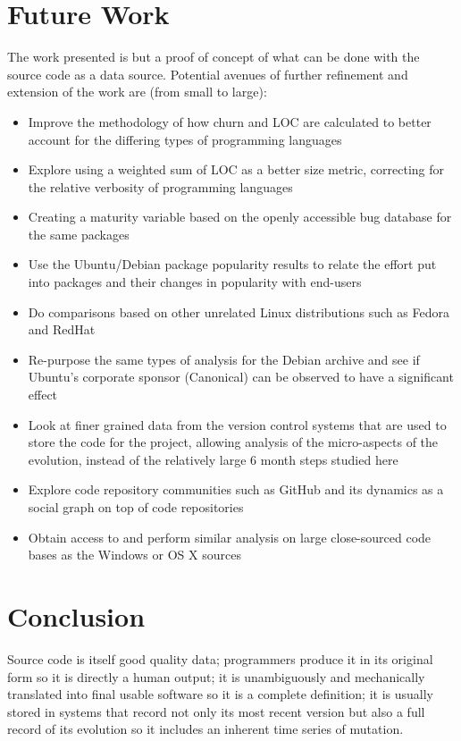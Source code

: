 \documentclass[11pt]{article}
\begin{document}
\section{Future Work}

The work presented is but a proof of concept of what can be done with the source code as a data source. Potential avenues of further refinement and extension of the work are (from small to large):
\begin{itemize}
\item Improve the methodology of how churn and LOC are calculated to better account for the differing types of programming languages
\item Explore using a weighted sum of LOC as a better size metric, correcting for the relative verbosity of programming languages
\item Creating a maturity variable based on the openly accessible bug database for the same packages
\item Use the Ubuntu/Debian package popularity results to relate the effort put into packages and their changes in popularity with end-users
\item Do comparisons based on other unrelated Linux distributions such as Fedora and RedHat
\item Re-purpose the same types of analysis for the Debian archive and see if Ubuntu's corporate sponsor (Canonical) can be observed to have a significant effect
\item Look at finer grained data from the version control systems that are used to store the code for the project, allowing analysis of the micro-aspects of the evolution, instead of the relatively large 6 month steps studied here
\item Explore code repository communities such as GitHub and its dynamics as a social graph on top of code repositories
\item Obtain access to and perform similar analysis on large close-sourced code bases as the Windows or OS X sources
\end{itemize}

\section{Conclusion}

Source code is itself good quality data; programmers produce it in its original form so it is directly a human output; it is unambiguously and mechanically translated into final usable software so it is a complete definition; it is usually stored in systems that record not only its most recent version but also a full record of its evolution so it includes an inherent time series of mutation. 
\end{document}
